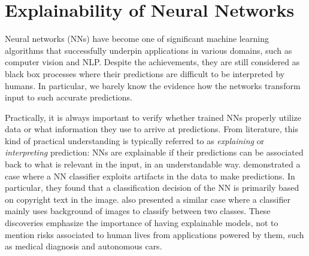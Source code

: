 \section{Explainability of Neural Networks}
Neural networks (NNs) have become one of significant machine learning algorithms that successfully underpin applications in various domains, such as  computer vision and NLP. Despite the achievements, they are still considered as black box processes where their predictions are difficult to be interpreted by  humans. In particular, we barely know the evidence how the networks transform input to such accurate predictions.

%  
%
%

%


Practically, it is always important to verify whether trained NNs properly utilize data or what information they use to arrive at predictions. From literature, this kind of practical understanding is typically referred to as \textit{explaining} or \textit{interpreting} prediction: NNs are explainable if their predictions can be associated back to what is relevant in the input, in an understandable way. \citet{BachAnalyzingclassifiersFisher2016} demonstrated a case where a NN classifier exploits artifacts in the data to make predictions. In particular, they found that  a classification decision of the NN is primarily based on copyright text in the image. \citet{RibeiroWhyShouldTrust2016} also presented a similar case where a classifier mainly uses background of images to classify between two classes. These discoveries emphasize the importance of having explainable models, not to mention risks associated to human lives from applications powered by them, such as medical diagnosis and autonomous cars.
%

